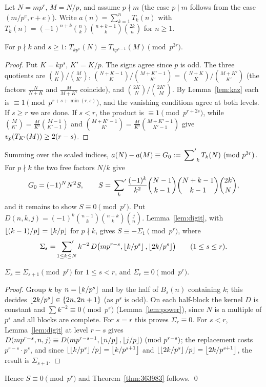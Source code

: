 \documentclass[11pt]{amsart}
\begin{document}
Let $N=mp^r$, $M=N/p$, and assume $p\nmid m$ (the case $p\mid m$ follows from the case $(m/p^e,r+e)$). Write $a(n)=\sum_{k=1}^nT_k(n)$ with $T_k(n)=(-1)^{n+k}\binom nk\binom{n+k-1}k\binom{2k}n$ for $n\ge1$.

\begin{lemma}\label{lem:363-scaled}
For $p\nmid k$ and $s\ge1$: $T_{kp^s}(N)\equiv T_{kp^{s-1}}(M)\pmod{p^{3r}}$.
\end{lemma}
\begin{proof}
Put $K=kp^s$, $K'=K/p$. The signs agree since $p$ is odd. The three quotients are $\binom NK/\binom M{K'}$, $\binom{N+K-1}K/\binom{M+K'-1}{K'}=\binom{N+K}K/\binom{M+K'}{K'}$ (the factors $\frac N{N+K}$ and $\frac M{M+K'}$ coincide), and $\binom{2K}N/\binom{2K'}M$. By Lemma~\ref{lem:kaz} each is $\equiv1\pmod{p^{r+s+\min(r,s)}}$, and the vanishing conditions agree at both levels. If $s\ge r$ we are done. If $s<r$, the product is $\equiv1\pmod{p^{r+2s}}$, while $\binom M{K'}=\frac M{K'}\binom{M-1}{K'-1}$ and $\binom{M+K'-1}{K'}=\frac M{K'}\binom{M+K'-1}{K'-1}$ give $v_p(T_{K'}(M))\ge2(r-s)$.
\end{proof}
Summing over the scaled indices, $a(N)-a(M)\equiv G_0:=\sideset{}{'}\sum_kT_k(N)\ (\mathrm{mod}\ p^{3r})$. For $p\nmid k$ the two free factors $N/k$ give
\[ G_0=(-1)^NN^2S,\qquad S=\sideset{}{'}\sum_{k}\frac{(-1)^k}{k^2}\binom{N-1}{k-1}\binom{N+k-1}{k-1}\binom{2k}N, \]
and it remains to show $S\equiv0\pmod{p^r}$. Put $D(n,k,j)=(-1)^k\binom{n-1}k\binom{n+k}k\binom jn$. Lemma~\ref{lem:digit}, with $\left\lfloor (k-1)/p\right\rfloor=\left\lfloor k/p\right\rfloor$ for $p\nmid k$, gives $S\equiv-\Sigma_1\pmod{p^r}$, where
\[ \Sigma_s=\sideset{}{'}\sum_{1\le k\le N}k^{-2}\,D\bigl(mp^{r-s},\left\lfloor k/p^s\right\rfloor,\left\lfloor 2k/p^s\right\rfloor\bigr)\qquad(1\le s\le r). \]
\begin{lemma}\label{lem:363-chain}
$\Sigma_s\equiv\Sigma_{s+1}\pmod{p^r}$ for $1\le s<r$, and $\Sigma_r\equiv0\pmod{p^r}$.
\end{lemma}
\begin{proof}
Group $k$ by $n=\left\lfloor k/p^s\right\rfloor$ and by the half of $B_s(n)$ containing $k$; this decides $\left\lfloor 2k/p^s\right\rfloor\in\{2n,2n+1\}$ (as $p^s$ is odd). On each half-block the kernel $D$ is constant and $\sum k^{-2}\equiv0\pmod{p^s}$ (Lemma~\ref{lem:power}), since $N$ is a multiple of $p^s$ and all blocks are complete. For $s=r$ this proves $\Sigma_r\equiv0$. For $s<r$, Lemma~\ref{lem:digit} at level $r-s$ gives $D(mp^{r-s},n,j)\equiv D(mp^{r-s-1},\left\lfloor n/p\right\rfloor,\left\lfloor j/p\right\rfloor)\ (\mathrm{mod}\ p^{r-s})$; the replacement costs $p^{r-s}\cdot p^s$, and since $\left\lfloor \left\lfloor k/p^s\right\rfloor/p\right\rfloor=\left\lfloor k/p^{s+1}\right\rfloor$ and $\left\lfloor \left\lfloor 2k/p^s\right\rfloor/p\right\rfloor=\left\lfloor 2k/p^{s+1}\right\rfloor$, the result is $\Sigma_{s+1}$.
\end{proof}
Hence $S\equiv0\pmod{p^r}$ and Theorem~\ref{thm:363983} follows. \qed
\end{document}
